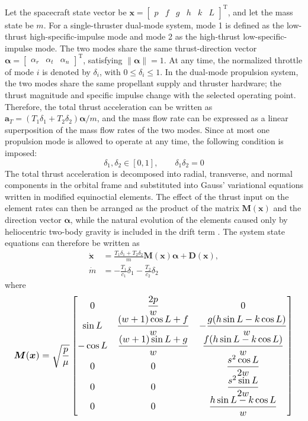 \documentclass{IEEEtaes}
\begin{document}
Let the spacecraft state vector be $\bm{x}=\begin{bmatrix}p&f&g&h&k&L\end{bmatrix}^{\mathrm{T}}$, and let the mass state be $m$. For a single-thruster dual-mode system, mode 1 is defined as the low-thrust high-specific-impulse mode and mode 2 as the high-thrust low-specific-impulse mode. The two modes share the same thrust-direction vector $\bm{\alpha}=\begin{bmatrix}\alpha_r&\alpha_t&\alpha_n\end{bmatrix}^{\mathrm{T}}$, satisfying $\|\bm{\alpha}\|=1$. At any time, the normalized throttle of mode $i$ is denoted by $\delta_i$, with $0\leq\delta_i\leq1$. In the dual-mode propulsion system, the two modes share the same propellant supply and thruster hardware; the thrust magnitude and specific impulse change with the selected operating point. Therefore, the total thrust acceleration can be written as $\bm{a}_T=(T_1\delta_1+T_2\delta_2)\bm{\alpha}/m$, and the mass flow rate can be expressed as a linear superposition of the mass flow rates of the two modes. Since at most one propulsion mode is allowed to operate at any time, the following condition is imposed:
\begin{equation}
\delta_1,\delta_2\in[0,1],\qquad \delta_1\delta_2=0
\end{equation}
The total thrust acceleration is decomposed into radial, transverse, and normal components in the orbital frame and substituted into Gauss' variational equations written in modified equinoctial elements. The effect of the thrust input on the element rates can then be arranged as the product of the matrix $\bm{M}(\bm{x})$ and the direction vector $\bm{\alpha}$, while the natural evolution of the elements caused only by heliocentric two-body gravity is included in the drift term \cite{jiang2012,chi2022}. The system state equations can therefore be written as
\begin{equation}
\begin{aligned}
\dot{\bm{x}}&=\frac{T_1\delta_1+T_2\delta_2}{m}\bm{M}(\bm{x})\bm{\alpha}+\bm{D}(\bm{x}),\\
\dot{m}&=-\frac{T_1}{c_1}\delta_1-\frac{T_2}{c_2}\delta_2
\end{aligned}
\end{equation}
where
\begin{equation}
\resizebox{0.98\columnwidth}{!}{$\displaystyle
\bm{M}(\bm{x})=\sqrt{\frac{p}{\mu}}
\begin{bmatrix}
0 & \dfrac{2p}{w} & 0\\
\sin L & \dfrac{(w+1)\cos L+f}{w} & -\dfrac{g(h\sin L-k\cos L)}{w}\\
-\cos L & \dfrac{(w+1)\sin L+g}{w} & \dfrac{f(h\sin L-k\cos L)}{w}\\
0 & 0 & \dfrac{s^2\cos L}{2w}\\
0 & 0 & \dfrac{s^2\sin L}{2w}\\
0 & 0 & \dfrac{h\sin L-k\cos L}{w}
\end{bmatrix}
$}
\end{equation}
\end{document}
